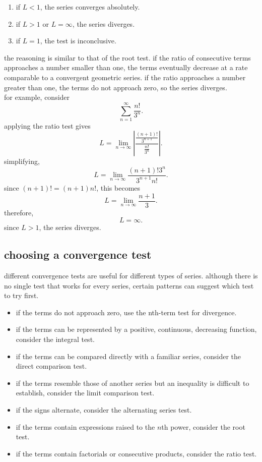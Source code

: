 \documentclass{article}
\begin{document}
\begin{enumerate}
    \item if $L<1$, the series converges absolutely.
    \item if $L>1$ or $L=\infty$, the series diverges.
    \item if $L=1$, the test is inconclusive.
\end{enumerate}

the reasoning is similar to that of the root test. if the ratio of consecutive terms approaches a number smaller than one, the terms eventually decrease at a rate comparable to a convergent geometric series. if the ratio approaches a number greater than one, the terms do not approach zero, so the series diverges.\\

for example, consider
\[
\sum_{n=1}^{\infty}\frac{n!}{3^n}.
\]
applying the ratio test gives
\[
L=
\lim_{n\to\infty}
\left|
\frac{\frac{(n+1)!}{3^{n+1}}}
{\frac{n!}{3^n}}
\right|.
\]
simplifying,
\[
L=
\lim_{n\to\infty}
\frac{(n+1)!3^n}{3^{n+1}n!}.
\]
since $(n+1)!=(n+1)n!$, this becomes
\[
L=
\lim_{n\to\infty}\frac{n+1}{3}.
\]
therefore,
\[
L=\infty.
\]
since $L>1$, the series diverges.\\

\subsection{choosing a convergence test}

different convergence tests are useful for different types of series. although there is no single test that works for every series, certain patterns can suggest which test to try first.\\

\begin{itemize}
    \item if the terms do not approach zero, use the nth-term test for divergence.
    \item if the terms can be represented by a positive, continuous, decreasing function, consider the integral test.
    \item if the terms can be compared directly with a familiar series, consider the direct comparison test.
    \item if the terms resemble those of another series but an inequality is difficult to establish, consider the limit comparison test.
    \item if the signs alternate, consider the alternating series test.
    \item if the terms contain expressions raised to the $n$th power, consider the root test.
    \item if the terms contain factorials or consecutive products, consider the ratio test.
\end{itemize}
\end{document}

